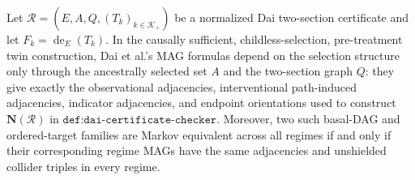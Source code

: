 Let \(\mathcal R=(E,A,Q,(T_k)_{k\in\mathcal K_+})\) be a normalized Dai two-section certificate and let \(F_k=\operatorname{de}_E(T_k)\).  In the causally sufficient, childless-selection, pre-treatment twin construction, Dai et al.'s MAG formulas depend on the selection structure only through the ancestrally selected set \(A\) and the two-section graph \(Q\): they give exactly the observational adjacencies, interventional path-induced adjacencies, indicator adjacencies, and endpoint orientations used to construct \(\mathbf N(\mathcal R)\) in \(\texttt{def:dai-certificate-checker}\).  Moreover, two such basal-DAG and ordered-target families are Markov equivalent across all regimes if and only if their corresponding regime MAGs have the same adjacencies and unshielded collider triples in every regime.